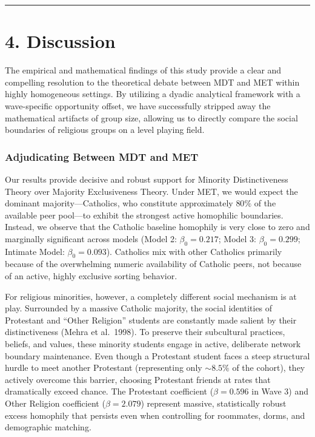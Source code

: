 \documentclass[
  letterpaper,
  DIV=11,
  numbers=noendperiod]{scrartcl}
\begin{document}
\begin{center}\rule{0.5\linewidth}{0.5pt}\end{center}

\section{4. Discussion}\label{discussion}

The empirical and mathematical findings of this study provide a clear
and compelling resolution to the theoretical debate between MDT and MET
within highly homogeneous settings. By utilizing a dyadic analytical
framework with a wave-specific opportunity offset, we have successfully
stripped away the mathematical artifacts of group size, allowing us to
directly compare the social boundaries of religious groups on a level
playing field.

\subsubsection{Adjudicating Between MDT and
MET}\label{adjudicating-between-mdt-and-met}

Our results provide decisive and robust support for Minority
Distinctiveness Theory over Majority Exclusiveness Theory. Under MET, we
would expect the dominant majority---Catholics, who constitute
approximately \(80\%\) of the available peer pool---to exhibit the
strongest active homophilic boundaries. Instead, we observe that the
Catholic baseline homophily is very close to zero and marginally
significant across models (Model 2: \(\beta_0 = 0.217\); Model 3:
\(\beta_0 = 0.299\); Intimate Model: \(\beta_0 = 0.093\)). Catholics mix
with other Catholics primarily because of the overwhelming numeric
availability of Catholic peers, not because of an active, highly
exclusive sorting behavior.

For religious minorities, however, a completely different social
mechanism is at play. Surrounded by a massive Catholic majority, the
social identities of Protestant and ``Other Religion'' students are
constantly made salient by their distinctiveness (Mehra et al.~1998). To
preserve their subcultural practices, beliefs, and values, these
minority students engage in active, deliberate network boundary
maintenance. Even though a Protestant student faces a steep structural
hurdle to meet another Protestant (representing only \(\sim 8.5\%\) of
the cohort), they actively overcome this barrier, choosing Protestant
friends at rates that dramatically exceed chance. The Protestant
coefficient (\(\beta = 0.596\) in Wave 3) and Other Religion coefficient
(\(\beta = 2.079\)) represent massive, statistically robust excess
homophily that persists even when controlling for roommates, dorms, and
demographic matching.
\end{document}
